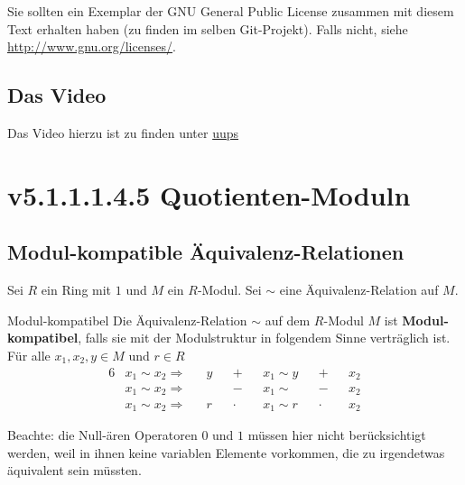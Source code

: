 \documentclass[a4paper]{amsart}
\theoremstyle{definition}
\begin{document}
Sie sollten ein Exemplar der GNU General Public License zusammen mit diesem Text erhalten haben
(zu finden im selben Git-Projekt).
Falls nicht, siehe \url{http://www.gnu.org/licenses/}.

\subsection*{Das Video}
Das Video hierzu ist zu finden unter
{\tiny
   \url{uups}
}

\section{v5.1.1.1.4.5 Quotienten-Moduln}

\subsection{Modul-kompatible Äquivalenz-Relationen}
Sei $R$ ein Ring mit $1$ und $M$ ein $R$-Modul. Sei $\sim$ eine Äquivalenz-Relation auf $M$.
\begin{Definition}{Modul-kompatibel}
   Die Äquivalenz-Relation $\sim$ auf dem $R$-Modul $M$ ist \textbf{Modul-kompatibel}, falls sie mit der Modulstruktur in folgendem Sinne verträglich ist. Für alle $x_1, x_2, y \in M$ und $r \in R$
   \begin{alignat}{6}
      &x_1 \sim x_2 \Rightarrow &&y &&+      &&x_1 \sim y &&+       &&x_2 \\
      &x_1 \sim x_2 \Rightarrow &&       &&-      &&x_1 \sim        &&-       &&x_2 \\
      &x_1 \sim x_2 \Rightarrow &&r      &&\cdot  &&x_1 \sim r      && \cdot  &&x_2 
   \end{alignat}
\end{Definition}
Beachte: die Null-ären Operatoren $0$ und $1$ müssen hier nicht berücksichtigt werden, weil in ihnen keine variablen Elemente vorkommen, die zu irgendetwas äquivalent sein müssten.
\end{document}
